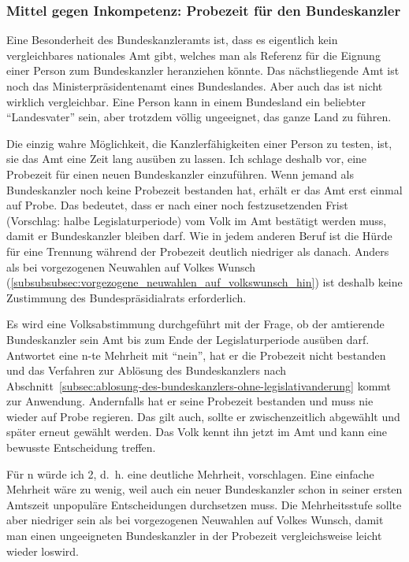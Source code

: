 \subsubsection{Mittel gegen Inkompetenz: Probezeit für den Bundeskanzler}\label{subsubsec:probezeit}
Eine Besonderheit des Bundeskanzleramts ist, dass es eigentlich kein vergleichbares nationales Amt gibt, welches man als Referenz für die Eignung einer Person zum Bundeskanzler heranziehen könnte.
Das nächstliegende Amt ist noch das Ministerpräsidentenamt eines Bundeslandes.
Aber auch das ist nicht wirklich vergleichbar.
Eine Person kann in einem Bundesland ein beliebter \enquote{Landesvater} sein, aber trotzdem völlig ungeeignet, das ganze Land zu führen.

Die einzig wahre Möglichkeit, die Kanzlerfähigkeiten einer Person zu testen, ist, sie das Amt eine Zeit lang ausüben zu lassen.
Ich schlage deshalb vor, eine Probezeit für einen neuen Bundeskanzler einzuführen.
Wenn jemand als Bundeskanzler noch keine Probezeit bestanden hat, erhält er das Amt erst einmal auf Probe.
Das bedeutet, dass er nach einer noch festzusetzenden Frist (Vorschlag: halbe Legislaturperiode) vom Volk im Amt bestätigt werden muss, damit er Bundeskanzler bleiben darf.
Wie in jedem anderen Beruf ist die Hürde für eine Trennung während der Probezeit deutlich niedriger als danach.
Anders als bei vorgezogenen Neuwahlen auf Volkes Wunsch (\cref{subsubsubsec:vorgezogene_neuwahlen_auf_volkswunsch_hin}) ist deshalb keine Zustimmung des Bundespräsidialrats erforderlich.

Es wird eine Volksabstimmung durchgeführt mit der Frage, ob der amtierende Bundeskanzler sein Amt bis zum Ende der Legislaturperiode ausüben darf.
Antwortet eine n-te Mehrheit mit \enquote{nein}, hat er die Probezeit nicht bestanden und das Verfahren zur Ablösung des Bundeskanzlers nach Abschnitt~\ref{subsec:ablosung-des-bundeskanzlers-ohne-legislativanderung} kommt zur Anwendung.
Andernfalls hat er seine Probezeit bestanden und muss nie wieder auf Probe regieren.
Das gilt auch, sollte er zwischenzeitlich abgewählt und später erneut gewählt werden.
Das Volk kennt ihn jetzt im Amt und kann eine bewusste Entscheidung treffen.

Für n würde ich 2, d.~h. eine deutliche Mehrheit, vorschlagen.
Eine einfache Mehrheit wäre zu wenig, weil auch ein neuer Bundeskanzler schon in seiner ersten Amtszeit unpopuläre Entscheidungen durchsetzen muss.
Die Mehrheitsstufe sollte aber niedriger sein als bei vorgezogenen Neuwahlen auf Volkes Wunsch, damit man einen ungeeigneten Bundeskanzler in der Probezeit vergleichsweise leicht wieder loswird.

